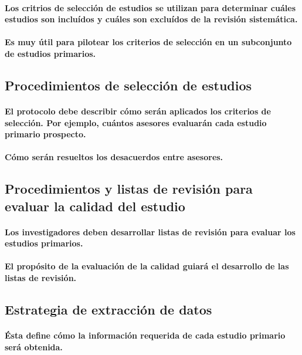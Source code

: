 \documentclass[10pt, twocolumn]{article}
\begin{document}
\paragraph{Los critrios de selección de estudios se utilizan para determinar cuáles estudios son incluídos y cuáles son excluídos de la revisión sistemática.}
\paragraph{Es muy útil para pilotear los criterios de selección en un subconjunto de estudios primarios.}

\subsection{Procedimientos de selección de estudios}
\paragraph{El protocolo debe describir cómo serán aplicados los criterios de selección. Por ejemplo, cuántos asesores evaluarán cada estudio primario prospecto.}
\paragraph{Cómo serán resueltos los desacuerdos entre asesores.}

\subsection{Procedimientos y listas de revisión para evaluar la calidad del estudio}
\paragraph{Los investigadores deben desarrollar listas de revisión para evaluar los estudios primarios.}
\paragraph{El propósito de la evaluación de la calidad guiará el desarrollo de las listas de revisión.}

\subsection{Estrategia de extracción de datos}
\paragraph{Ésta define cómo la información requerida de cada estudio primario será obtenida.}
\end{document}
